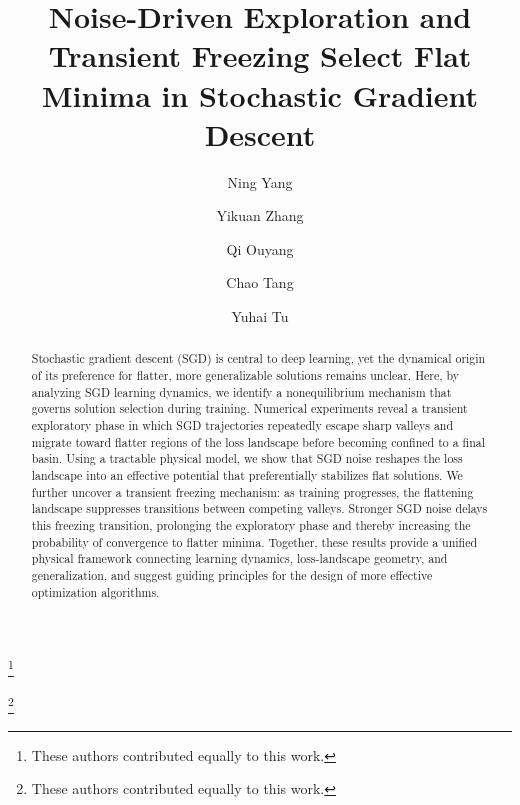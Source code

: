 \documentclass[aps,prx,reprint,superscriptaddress,longbibliography,nofootinbib,floatfix]{revtex4-2}
\begin{document}


\title{Noise-Driven Exploration and Transient Freezing Select Flat Minima in Stochastic Gradient Descent}

\author{Ning Yang}
\thanks{These authors contributed equally to this work.}

\author{Yikuan Zhang}
\thanks{These authors contributed equally to this work.}

\author{Qi Ouyang}

\author{Chao Tang}

\author{Yuhai Tu}

\begin{abstract}
    Stochastic gradient descent (SGD) is central to deep learning, yet the dynamical origin of its preference for flatter, more generalizable solutions remains unclear. Here, by analyzing SGD learning dynamics, we identify a nonequilibrium mechanism that governs solution selection during training. Numerical experiments reveal a transient exploratory phase in which SGD trajectories repeatedly escape sharp valleys and migrate toward flatter regions of the loss landscape before becoming confined to a final basin. Using a tractable physical model, we show that SGD noise reshapes the loss landscape into an effective potential that preferentially stabilizes flat solutions. We further uncover a transient freezing mechanism: as training progresses, the flattening landscape suppresses transitions between competing valleys. Stronger SGD noise delays this freezing transition, prolonging the exploratory phase and thereby increasing the probability of convergence to flatter minima. Together, these results provide a unified physical framework connecting learning dynamics, loss-landscape geometry, and generalization, and suggest guiding principles for the design of more effective optimization algorithms.

    
\end{abstract}
\end{document}

